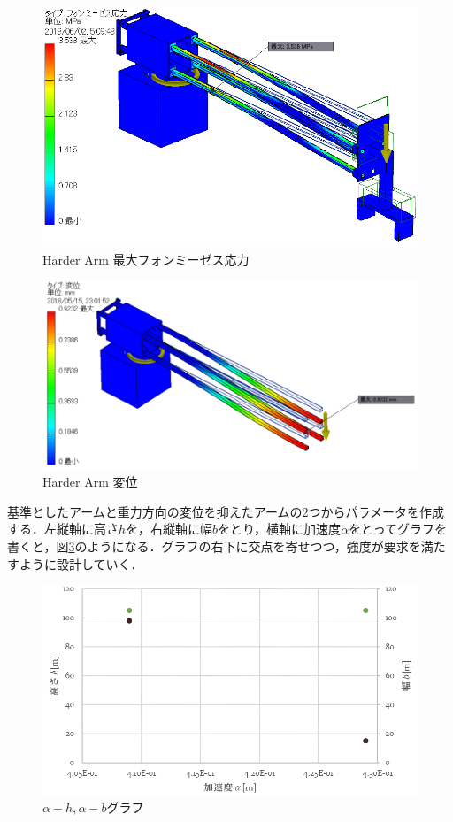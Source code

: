 \documentclass[10pt,b5paper,papersize,dvipdfmx]{jsbook}
\begin{document}
%
\begin{figure}[H]
  \centering
  \includegraphics[width=.65\textwidth]{img/robot19.png}
  \caption{Harder Arm 最大フォンミーゼス応力}
  \label{fig:Harder Arm 最大フォンミーゼス応力}
\end{figure}
%
\begin{figure}[H]
  \centering
  \includegraphics[width=.68\textwidth]{img/robot20.png}
  \caption{Harder Arm 変位}
  \label{fig:Harder Arm 変位}
\end{figure}
%
基準としたアームと重力方向の変位を抑えたアームの2つからパラメータを作成する．左縦軸に高さ$h$を，右縦軸に幅$b$をとり，横軸に加速度$\alpha$をとってグラフを書くと，図\ref{fig:alpha-h, alpha-b グラフ}のようになる．グラフの右下に交点を寄せつつ，強度が要求を満たすように設計していく．
%
\begin{figure}[htb]
  \centering
  \includegraphics[width=.7\textwidth]{img/robot21.png}
  \caption{$\alpha-h, \alpha-b$グラフ}
  \label{fig:alpha-h, alpha-b グラフ}
\end{figure}
\end{document}
